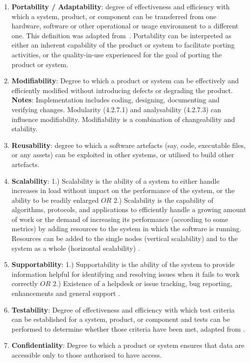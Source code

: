 \begin{enumerate}
    \item \textbf{Portability / Adaptability}: degree of effectiveness and efficiency with which a system, product, or component can be transferred from one hardware, software or other operational or usage environment to a different one. This definition was adapted from~\cite{iso_central_secretary_isoiecieee_2010}. Portability can be interpreted as either an inherent capability of the product or system to facilitate porting activities, or the quality-in-use experienced for the goal of porting the product or system.

    \item \textbf{Modifiability}: Degree to which a product or system can be effectively and efficiently modified without introducing defects or degrading the product. \textbf{Notes}: Implementation includes coding, designing, documenting and verifying changes. Modularity (4.2.7.1) and analysability (4.2.7.3) can influence modifiability. Modifiability is a combination of changeability and stability. 

    \item \textbf{Reusability}: degree to which a software artefacts (say, code, executable files, or any assets) can be exploited in other systems, or utilised to build other artefacts.

    \item \textbf{Scalability}: 1.) Scalability is the ability of a system to either handle increases in load without impact on the performance of the system, or the ability to be readily enlarged \cite{microsoft_2010} $OR$ 2.) Scalability is the capability of algorithms, protocols, and applications to efficiently handle a growing amount of work or the demand of increasing its performance (according to some metrics) by adding resources to the system in which the software is running. Resources can be added to the single nodes (vertical scalability) and to the system as a whole (horizontal scalability) \cite{bondi_2000}.

    \item \textbf{Supportability}: 1.) Supportability is the ability of the system to provide information helpful for identifying and resolving issues when it fails to work correctly \cite{microsoft_2010} $OR$ 2.) Existence of a helpdesk or issue tracking, bug reporting, enhancements and general support \cite{orviz_fernandez_eosc-synergy_2020}.

    \item \textbf{Testability}: Degree of effectiveness and efficiency with which test criteria can be established for a system, product, or component and tests can be performed to determine whether those criteria have been met, adapted from \cite{iso_central_secretary_isoiecieee_2010}.

    \item \textbf{Confidentiality}: Degree to which a product or system ensures that data are accessible only to those authorised to have access.
\end{enumerate}


